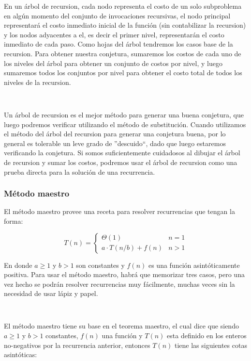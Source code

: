 En un \'arbol de recursion, cada nodo representa el costo de un solo subproblema en alg\'un momento del conjunto de invocaciones recursivas, el nodo principal representar\'a el costo inmediato inicial de la funci\'on (sin contabilizar la recursion) y los nodos adyacentes a el, es decir el primer nivel, representar\'an el costo inmediato de cada paso. Como hojas del \'arbol tendremos los casos base de la recursion. Para obtener nuestra conjetura, sumaremos los costos de cada uno de los niveles del \'arbol para obtener un conjunto de costos por nivel, y luego sumaremos todos los conjuntos por nivel para obtener el costo total de todos los niveles de la recursion.

~

Un \'arbol de recursion es el mejor m\'etodo para generar una buena conjetura, que luego podremos verificar utilizando el m\'etodo de substituci\'on. Cuando utilizamos el m\'etodo del \'arbol del recursion para generar una conjetura buena, por lo general es tolerable un leve grado de ''descuido``, dado que luego estaremos verificando la conjetura. Si somos suficientemente cuidadosos al dibujar el \'arbol de recursion y sumar los costos, podremos usar el \'arbol de recursion como una prueba directa para la soluci\'on de una recurrencia.

\subsubsection{M\'etodo maestro}

El m\'etodo maestro provee una receta para resolver recurrencias que tengan la forma:

\begin{equation*}
  T(n) = \begin{cases}
	      \Theta(1)         		& n=1 \\
	      a \cdot T(n/b) + f(n)        	& n > 1
	  \end{cases}
\end{equation*}

En donde $a \geq 1$ y $b>1$ son constantes y $f(n)$ es una funci\'on asint\'oticamente positiva. Para usar el m\'etodo maestro, habr\'a que memorizar tres casos, pero una vez hecho se podr\'an resolver recurrencias muy f\'acilmente, muchas veces sin la necesidad de usar l\'apiz y papel.

~

El m\'etodo maestro tiene su base en el teorema maestro, el cual dice que siendo $a\geq 1$ y $b>1$ constantes, $f(n)$ una funci\'on y $T(n)$ esta definido en los enteros no-negativos por la recurrencia anterior, entonces $T(n)$ tiene las siguientes cotas asint\'oticas:

